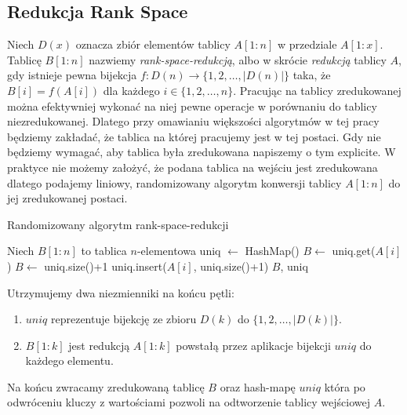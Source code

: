 \subsection{Redukcja Rank Space}
Niech $D(x)$ oznacza zbiór elementów tablicy $A[1:n]$ w przedziale $A[1:x]$. Tablicę $B[1:n]$ nazwiemy \emph{rank-space-redukcją}, albo w skrócie \emph{redukcją} tablicy $A$, gdy istnieje pewna bijekcja $f: D(n) \rightarrow \{1, 2, \dots, |D(n)|\}$ taka, że $B[i] = f(A[i])$ dla każdego $i \in \{1,2,\dots,n\}$. Pracując na tablicy zredukowanej można efektywniej wykonać na niej pewne operacje w porównaniu do tablicy niezredukowanej. Dlatego przy omawianiu większości algorytmów w tej pracy będziemy zakładać, że tablica na której pracujemy jest w tej postaci. Gdy nie będziemy wymagać, aby tablica była zredukowana napiszemy o tym explicite.
W praktyce nie możemy założyć, że podana tablica na wejściu jest zredukowana dlatego podajemy liniowy, randomizowany algorytm konwersji tablicy $A[1:n]$ do jej zredukowanej postaci.
\begin{algorithm}[H]
    \caption{Randomizowany algorytm rank-space-redukcji}
    \label{alg:rank space reduction}
    \begin{algorithmic}[1]
            \State Niech $B[1:n]$ to tablica $n$-elementowa
            \State uniq $\gets$ HashMap()
                    \State $B \gets$ uniq.get($A[i]$)
                \Else
                    \State $B \gets$ uniq.size()+1
                    \State uniq.insert($A[i]$, uniq.size()+1)
              \EndIf
            \EndFor
            \Return $B$, uniq
        \EndFunction
    \end{algorithmic}
\end{algorithm}
\hspace{-1.66em}Utrzymujemy dwa niezmienniki na końcu pętli:\vspace{-0.60em}
\begin{enumerate}
    \item $uniq$ reprezentuje bijekcję ze zbioru $D(k)$ do $\{1, 2, \dots, |D(k)|\}$.\vspace{-0.60em}
    \item $B[1:k]$ jest redukcją $A[1:k]$ powstałą przez aplikacje bijekcji $uniq$ do każdego elementu.
\end{enumerate}
Na końcu zwracamy zredukowaną tablicę $B$ oraz hash-mapę $uniq$ która po odwróceniu kluczy z wartościami pozwoli na odtworzenie tablicy wejściowej $A$.
\newpage

